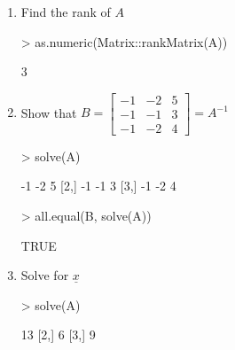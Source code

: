 \documentclass[12pt,a4paper]{paper}
\begin{document}
\begin{enumerate}
\begin{enumerate}
\item Find the rank of $A$
\begin{Schunk}
\begin{Sinput}
> as.numeric(Matrix::rankMatrix(A))
\end{Sinput}
\begin{Soutput}
[1] 3
\end{Soutput}
\end{Schunk}
\item Show that $B = \left[\begin{array}{ccc}-1 & -2 & 5 \\ -1 & -1 & 3 \\ -1 & -2 & 4\end{array}\right] = A^{-1}$
\begin{Schunk}
\begin{Sinput}
> solve(A)
\end{Sinput}
\begin{Soutput}
     [,1] [,2] [,3]
[1,]   -1   -2    5
[2,]   -1   -1    3
[3,]   -1   -2    4
\end{Soutput}
\begin{Sinput}
> all.equal(B, solve(A))
\end{Sinput}
\begin{Soutput}
[1] TRUE
\end{Soutput}
\end{Schunk}
\item Solve for $\underline{x}$
\begin{Schunk}
\begin{Sinput}
> solve(A) %*% b
\end{Sinput}
\begin{Soutput}
     [,1]
[1,]   13
[2,]    6
[3,]    9
\end{Soutput}
\end{Schunk}
\end{enumerate}
\end{enumerate}
\end{document}
